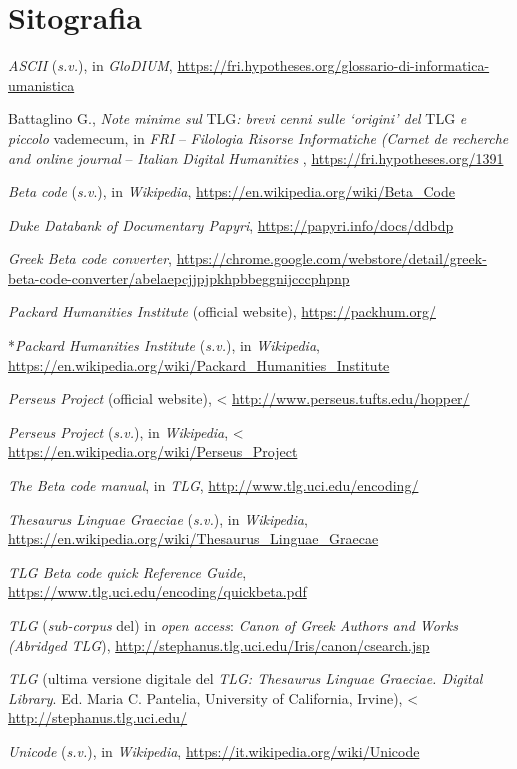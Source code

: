 \section*{Sitografia}
{\parindent0pt 
\emph{ASCII} (\emph{s.v.}), in \emph{GloDIUM},
\url{https://fri.hypotheses.org/glossario-di-informatica-umanistica}

Battaglino G., \emph{Note minime sul} TLG\emph{: brevi cenni sulle
`origini' del} TLG \emph{e piccolo} vademecum, in \emph{FRI} --
\emph{Filologia Risorse Informatiche} \emph{(Carnet de recherche and
online journal} -- \emph{Italian Digital Humanities} ,
\url{https://fri.hypotheses.org/1391}

\emph{Beta code} (\emph{s.v}.), in \emph{Wikipedia},
\url{https://en.wikipedia.org/wiki/Beta_Code}

\emph{Duke Databank of Documentary Papyri},
\url{https://papyri.info/docs/ddbdp}

\emph{Greek Beta code converter},
\url{https://chrome.google.com/webstore/detail/greek-beta-code-converter/abelaepcjjpjpkhpbbeggnijcccphpnp}

\emph{Packard Humanities Institute} (official website), 
\url{https://packhum.org/}

*\emph{Packard Humanities Institute} (\emph{s.v.}), in \emph{Wikipedia},
\url{https://en.wikipedia.org/wiki/Packard_Humanities_Institute}


\emph{Perseus Project} (official website), \textless{}
\url{http://www.perseus.tufts.edu/hopper/}

\emph{Perseus Project} (\emph{s.v.}), in \emph{Wikipedia}, \textless{}
\url{https://en.wikipedia.org/wiki/Perseus_Project}

\emph{The Beta code manual}, in \emph{TLG},
\url{http://www.tlg.uci.edu/encoding/}

\emph{Thesaurus Linguae Graeciae} (\emph{s.v.}), in \emph{Wikipedia},
\url{https://en.wikipedia.org/wiki/Thesaurus_Linguae_Graecae}

\emph{TLG Beta code quick Reference Guide},
\url{https://www.tlg.uci.edu/encoding/quickbeta.pdf}

\emph{TLG} (\emph{sub-corpus} del) in \emph{open access}: \emph{Canon of
Greek Authors and Works (Abridged TLG}),
\url{http://stephanus.tlg.uci.edu/Iris/canon/csearch.jsp}


\emph{TLG} (ultima versione digitale del \emph{TLG: Thesaurus Linguae
Graeciae. Digital Library}. Ed. Maria C. Pantelia, University of
California, Irvine), \textless{}
\url{http://stephanus.tlg.uci.edu/}

\emph{Unicode} (\emph{s.v.}), in \emph{Wikipedia},
\url{https://it.wikipedia.org/wiki/Unicode}
}



